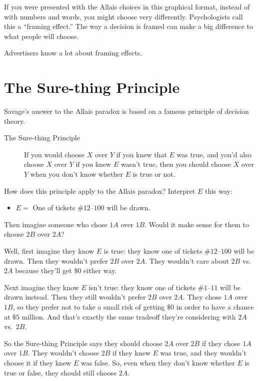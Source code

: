 \documentclass[justified]{tufte-book}
\providecommand{\tightlist}{%
  \setlength{\itemsep}{0pt}\setlength{\parskip}{0pt}}
\theoremstyle{definition}
\theoremstyle{definition}
\theoremstyle{definition}
\theoremstyle{definition}
\theoremstyle{remark}
\begin{document}
If you were presented with the Allais choices in this graphical format, instead of with numbers and words, you might choose very differently. Psychologists call this a ``framing effect.'' The way a decision is framed can make a big difference to what people will choose.

Advertisers know a lot about framing effects.

\hypertarget{the-sure-thing-principle}{%
\section{The Sure-thing Principle}\label{the-sure-thing-principle}}

Savage's answer to the Allais paradox is based on a famous principle of decision theory.

\begin{description}
\item[The Sure-thing Principle]
If you would choose \(X\) over \(Y\) if you knew that \(E\) was true, and you'd also choose \(X\) over \(Y\) if you knew \(E\) wasn't true, then you should choose \(X\) over \(Y\) when you don't know whether \(E\) is true or not.
\end{description}

How does this principle apply to the Allais paradox? Interpret \(E\) this way:

\begin{itemize}
\tightlist
\item
  \(E =\) One of tickets \#\(12\)--\(100\) will be drawn.
\end{itemize}

Then imagine someone who chose \(1A\) over \(1B\). Would it make sense for them to choose \(2B\) over \(2A\)?

Well, first imagine they know \(E\) is true: they know one of tickets \(\#12\)--\(100\) will be drawn. Then they wouldn't prefer \(2B\) over \(2A\). They wouldn't care about \(2B\) vs.~\(2A\) because they'll get \(\$0\) either way.

Next imagine they know \(E\) isn't true: they know one of tickets \(\#1\)--\(11\) will be drawn instead. Then they still wouldn't prefer \(2B\) over \(2A\). They chose \(1A\) over \(1B\), so they prefer not to take a small risk of getting \(\$0\) in order to have a chance at \(\$5\) million. And that's exactly the same tradeoff they're considering with \(2A\) vs.~\(2B\).

So the Sure-thing Principle says they should choose \(2A\) over \(2B\) if they chose \(1A\) over \(1B\). They wouldn't choose \(2B\) if they knew \(E\) was true, and they wouldn't choose it if they knew \(E\) was false. So, even when they don't know whether \(E\) is true or false, they should still choose \(2A\).
\end{document}
